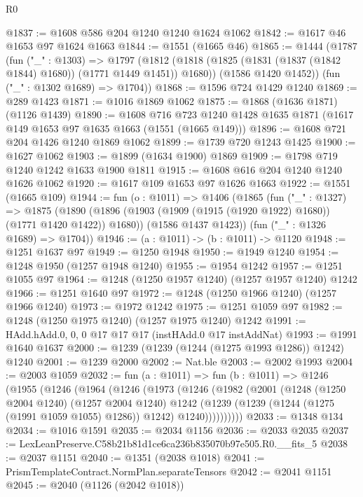 \begin{lexlean}{R0}
\begin{coremodule}
@1837 := @1608 @586 @204 @1240 @1240 @1624 @1062
@1842 := @1617 @46 @1653 @97 @1624 @1663
@1844 := @1551 (@1665 @46)
@1865 := @1444
    (@1787
      (fun ("_" : @1303) =>
      @1797
        (@1812 (@1818 (@1825 (@1831 (@1837 (@1842 @1844) @1680)) (@1771 @1449 @1451)) @1680))
        (@1586 @1420 @1452))
      (fun ("_" : @1302 @1689) => @1704))
@1868 := @1596 @724 @1429 @1240
@1869 := @289 @1423
@1871 := @1016 @1869 @1062
@1875 := @1868 (@1636 @1871) (@1126 @1439)
@1890 := @1608
    @716
    @723
    @1240
    @1428
    @1635
    @1871
    (@1617 @149 @1653 @97 @1635 @1663 (@1551 (@1665 @149)))
@1896 := @1608 @721 @204 @1426 @1240 @1869 @1062
@1899 := @1739 @720 @1243 @1425
@1900 := @1627 @1062
@1903 := @1899 (@1634 @1900) @1869
@1909 := @1798 @719 @1240 @1242 @1633 @1900 @1811
@1915 := @1608 @616 @204 @1240 @1240 @1626 @1062
@1920 := @1617 @109 @1653 @97 @1626 @1663
@1922 := @1551 (@1665 @109)
@1944 := fun (o : @1011) =>
  @1406
    (@1865
      (fun ("_" : @1327) =>
      @1875
        (@1890 (@1896 (@1903 (@1909 (@1915 (@1920 @1922) @1680)) (@1771 @1420 @1422)) @1680))
        (@1586 @1437 @1423))
      (fun ("_" : @1326 @1689) => @1704))
@1946 := (a : @1011) -> (b : @1011) -> @1120
@1948 := @1251 @1637 @97
@1949 := @1250 @1948
@1950 := @1949 @1240
@1954 := @1248 @1950 (@1257 @1948 @1240)
@1955 := @1954 @1242
@1957 := @1251 @1055 @97
@1964 := @1248 (@1250 @1957 @1240) (@1257 @1957 @1240) @1242
@1966 := @1251 @1640 @97
@1972 := @1248 (@1250 @1966 @1240) (@1257 @1966 @1240)
@1973 := @1972 @1242
@1975 := @1251 @1059 @97
@1982 := @1248 (@1250 @1975 @1240) (@1257 @1975 @1240) @1242
@1991 := HAdd.hAdd.{0, 0, 0} @17 @17 @17 (instHAdd.{0} @17 instAddNat)
@1993 := @1991 @1640 @1637
@2000 := @1239 (@1239 (@1244 (@1275 @1993 @1286)) @1242) @1240
@2001 := @1239 @2000
@2002 := Nat.ble
@2003 := @2002 @1993
@2004 := @2003 @1059
@2032 := fun (a : @1011) =>
  fun (b : @1011) =>
  @1246
    (@1955
      (@1246
        (@1964
          (@1246
            (@1973
              (@1246
                (@1982
                  (@2001
                    (@1248
                      (@1250 @2004 @1240)
                      (@1257 @2004 @1240)
                      @1242
                      (@1239 (@1239 (@1244 (@1275 (@1991 @1059 @1055) @1286)) @1242) @1240))))))))))
@2033 := @1348 @134
@2034 := @1016 @1591
@2035 := @2034 @1156
@2036 := @2033 @2035
@2037 := LexLeanPreserve.C58b21b81d1ce6ca236b835070b97e505.R0.__fits_5
@2038 := @2037 @1151
@2040 := @1351 (@2038 @1018)
@2041 := PrismTemplateContract.NormPlan.separateTensors
@2042 := @2041 @1151
@2045 := @2040 (@1126 (@2042 @1018))

\end{coremodule}
\end{lexlean}
